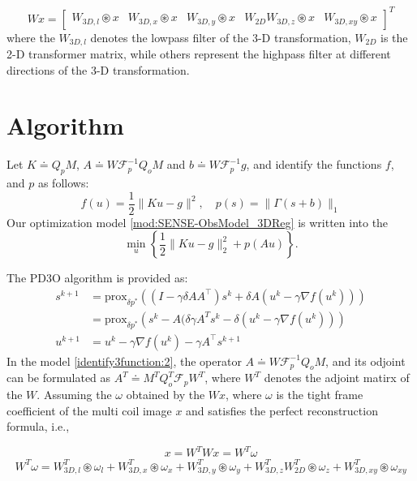 \documentclass[preprint]{elsarticle}
\begin{document}
	
	\begin{equation*}
		Wx = \begin{bmatrix}
			W_{3D, l}\circledast x & W_{3D, x}\circledast x & W_{3D, y}\circledast x & W_{2D}W_{3D, z}\circledast x & W_{3D, xy}\circledast x
		\end{bmatrix}^T
	\end{equation*}
	where the $W_{3D, l}$ denotes the lowpass filter of the 3-D transformation, $W_{2D}$ is the 2-D transformer matrix, while others represent the highpass filter at different directions of the 3-D transformation.
	
	\section{Algorithm}
	Let $K\doteq Q_{p}M$, $A\doteq W\mathcal{F}_p^{-1}Q_{o}M$ and $b \doteq W\mathcal{F}_p^{-1} g$,
	and identify the functions $f$, and $p$ as follows:
	\begin{equation}\label{identify3function:1}
		f(u)=\frac{1}{2}\|Ku-g\|^2, \quad p(s)=\| \Gamma (s+b)\| _{1}
	\end{equation}
	Our optimization model \eqref{mod:SENSE-ObsModel_3DReg} is written into
	the 
	\begin{equation}\label{identify3function:2}
		\min_{u}\left\{ \frac{1}{2}\| Ku-g \|_{2}^{2}+ p(Au)\right\}. 
	\end{equation}
	 
	The  PD3O algorithm is provided as:
	\begin{subequations}
		\begin{align*}
			s^{k+1}&=\mathrm{prox}_{\delta p^*}\left((I-\gamma\delta AA^\top)s^k+\delta A(u^k-\gamma \nabla f(u^k))\right)\\
			       &=\mathrm{prox}_{\delta p^*}\left( s^k - A  (\delta \gamma A^Ts^k - \delta(u^k-\gamma \nabla f(u^k)) \right) \\
			u^{k+1}&=u^k-\gamma \nabla f(u^k)-\gamma A^\top s^{k+1}
		\end{align*}
	\end{subequations}
	In the model \eqref{identify3function:2}, the operator $A\doteq W\mathcal{F}_p^{-1}Q_{o}M$, and its odjoint can be formulated as $A^T\doteq M^T Q_{o}^{T} \mathcal{F}_{p} W^T$, where $W^T$ denotes the adjoint matirx of the $W$. Assuming the $\omega$ obtained by the $Wx$, where $\omega$ is the tight frame coefficient of the multi coil image $x$ and satisfies the perfect reconstruction formula, i.e.,
	
	\begin{equation*}
		 x = W^T W x = W^T \omega
	\end{equation*}
	\begin{eqnarray*}
		W^T \omega = W_{3D, l}^{T}\circledast \omega_l + W_{3D, x}^{T}\circledast \omega_x + W_{3D, y}^{T}\circledast \omega_y + W_{3D, z}^{T} W_{2D}^{T}\circledast \omega_z+ W_{3D, xy}^{T} \circledast \omega_{xy}
	\end{eqnarray*}
	
\end{document}

